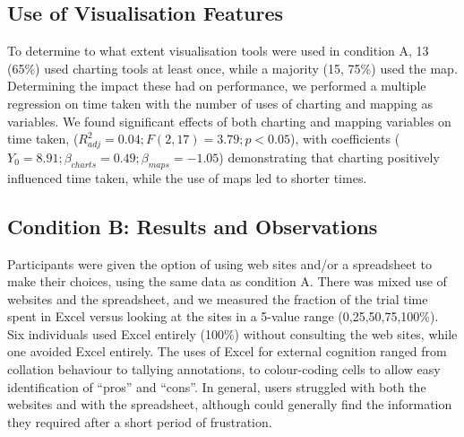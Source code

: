 \documentclass{sigchi}
\begin{document}
\subsection{Use of Visualisation Features}
To determine to what extent visualisation tools were used in condition A, 13 (65\%) used charting tools at least once, while a majority (15, 75\%) used the map.  Determining the impact these had on performance, we performed a multiple regression on time taken with the number of uses of charting and mapping as variables.   We found significant effects of both charting and mapping variables on time taken, ($R^2_{adj} = 0.04; F(2,17)=3.79; p<0.05$), with coefficients ($Y_0=8.91;\beta_{charts}=0.49;\beta_{maps}=-1.05$) demonstrating that charting positively influenced time taken, while the use of maps led to shorter times.

\subsection{Condition B: Results and Observations}
Participants were given the option of using web sites and/or a spreadsheet to make their choices, using the same data as condition A. There was mixed use of websites and the spreadsheet, and we measured the fraction of the trial time spent in Excel versus looking at the sites in a 5-value range (0,25,50,75,100\%).  Six individuals used Excel entirely (100\%) without consulting the web sites, while one avoided Excel entirely. The uses of Excel for external cognition ranged from collation behaviour to tallying annotations, to colour-coding cells to allow easy identification of  ``pros'' and ``cons''. In general, users struggled with both the websites and with the spreadsheet, although could generally find the information they required after a short period of frustration. 



\end{document}
